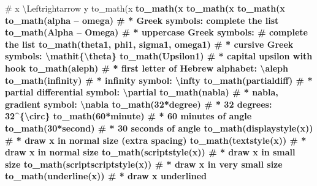 \documentclass[
]{krantz}
\makeatletter
\newenvironment{Shaded}{\begin{snugshade}}{\end{snugshade}}
\newcommand{\CommentTok}[1]{\textcolor[rgb]{0.56,0.35,0.01}{\textit{#1}}}
\newcommand{\DecValTok}[1]{\textcolor[rgb]{0.00,0.00,0.81}{#1}}
\newcommand{\KeywordTok}[1]{\textcolor[rgb]{0.13,0.29,0.53}{\textbf{#1}}}
\newcommand{\NormalTok}[1]{#1}
\newcommand{\OperatorTok}[1]{\textcolor[rgb]{0.81,0.36,0.00}{\textbf{#1}}}
\newcommand{\StringTok}[1]{\textcolor[rgb]{0.31,0.60,0.02}{#1}}
\newenvironment{kframe}{%
\medskip{}
\setlength{\fboxsep}{.8em}
 \def\at@end@of@kframe{}%
 \ifinner\ifhmode%
  \def\at@end@of@kframe{\end{minipage}}%
  \begin{minipage}{\columnwidth}%
 \fi\fi%
 \def\FrameCommand##1{\hskip\@totalleftmargin \hskip-\fboxsep
 \colorbox{shadecolor}{##1}\hskip-\fboxsep
     \hskip-\linewidth \hskip-\@totalleftmargin \hskip\columnwidth}%
 \MakeFramed {\advance\hsize-\width
   \@totalleftmargin\z@ \linewidth\hsize
   \@setminipage}}%
 {\par\unskip\endMakeFramed%
 \at@end@of@kframe}
\renewenvironment{Shaded}{\begin{kframe}}{\end{kframe}}
\renewcommand{\KeywordTok} [1]{\textcolor[rgb]{0.00,0.44,0.13}{{#1}}}
\renewcommand{\DecValTok}  [1]{\textcolor[rgb]{0.25,0.63,0.44}{{#1}}}
\renewcommand{\StringTok}  [1]{\textcolor[rgb]{0.25,0.44,0.63}{{#1}}}
\renewcommand{\CommentTok} [1]{\textcolor[rgb]{0.38,0.63,0.69}{{#1}}}
\renewcommand{\NormalTok}  [1]{{#1}}
\makeatother
\begin{document}
\begin{Shaded}
\begin{Highlighting}[]
{{{{{{{{{{{{{{{{{{{{{{\CommentTok{# x \textbackslash{}Leftrightarrow y}
\KeywordTok{to_math}\NormalTok{(x }\OperatorTok{%
\KeywordTok{to_math}\NormalTok{(x }\OperatorTok{%
\KeywordTok{to_math}\NormalTok{(x }\OperatorTok{%
\KeywordTok{to_math}\NormalTok{(x }\OperatorTok{%
\KeywordTok{to_math}\NormalTok{(alpha }\OperatorTok{--}\StringTok{ }\NormalTok{omega)  }\CommentTok{# * Greek symbols: complete the list}
\KeywordTok{to_math}\NormalTok{(Alpha }\OperatorTok{--}\StringTok{ }\NormalTok{Omega)  }\CommentTok{# * uppercase Greek symbols:}
\CommentTok{# complete the list}
\KeywordTok{to_math}\NormalTok{(theta1, phi1,}
\NormalTok{        sigma1, omega1)  }\CommentTok{# * cursive Greek symbols: \textbackslash{}mathit\{\textbackslash{}theta\}}
\KeywordTok{to_math}\NormalTok{(Upsilon1)        }\CommentTok{# * capital upsilon with hook}
\KeywordTok{to_math}\NormalTok{(aleph)           }\CommentTok{# * first letter of Hebrew alphabet: \textbackslash{}aleph}
\KeywordTok{to_math}\NormalTok{(infinity)        }\CommentTok{# * infinity symbol: \textbackslash{}infty }
\KeywordTok{to_math}\NormalTok{(partialdiff)     }\CommentTok{# * partial differential symbol: \textbackslash{}partial}
\KeywordTok{to_math}\NormalTok{(nabla)           }\CommentTok{# * nabla, gradient symbol: \textbackslash{}nabla}
\KeywordTok{to_math}\NormalTok{(}\DecValTok{32}\OperatorTok{*}\NormalTok{degree)       }\CommentTok{# * 32 degrees: 32^\{\textbackslash{}circ\}}
\KeywordTok{to_math}\NormalTok{(}\DecValTok{60}\OperatorTok{*}\NormalTok{minute)       }\CommentTok{# * 60 minutes of angle}
\KeywordTok{to_math}\NormalTok{(}\DecValTok{30}\OperatorTok{*}\NormalTok{second)       }\CommentTok{# * 30 seconds of angle}
\KeywordTok{to_math}\NormalTok{(}\KeywordTok{displaystyle}\NormalTok{(x)) }\CommentTok{# * draw x in normal size (extra spacing)}
\KeywordTok{to_math}\NormalTok{(}\KeywordTok{textstyle}\NormalTok{(x))    }\CommentTok{# * draw x in normal size}
\KeywordTok{to_math}\NormalTok{(}\KeywordTok{scriptstyle}\NormalTok{(x))  }\CommentTok{# * draw x in small size}
\KeywordTok{to_math}\NormalTok{(}\KeywordTok{scriptscriptstyle}\NormalTok{(x))  }\CommentTok{# * draw x in very small size}
\KeywordTok{to_math}\NormalTok{(}\KeywordTok{underline}\NormalTok{(x))    }\CommentTok{# * draw x underlined}
}}}}}}}}}}}}}}}}}}}}}}}}}}
\end{Highlighting}
\end{Shaded}
\end{document}
